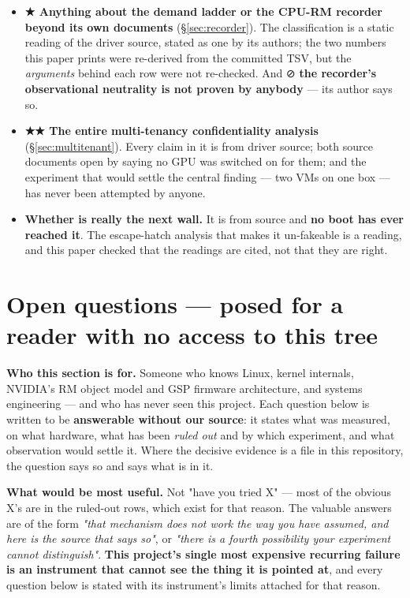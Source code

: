 \documentclass[10.5pt]{article}
\begin{document}
\begin{itemize}
  only the plan. Absence of evidence.
\item \textbf{★ Anything about the demand ladder or the CPU-RM recorder beyond its own documents}
  (\S\ref{sec:recorder}). The classification is a static reading of the driver source, stated as
  one by its authors; the two numbers this paper prints were re-derived from the committed TSV,
  but the \emph{arguments} behind each row were not re-checked. And ⊘ \textbf{the recorder's
  observational neutrality is not proven by anybody} — its author says so.
\item \textbf{★★ The entire multi-tenancy confidentiality analysis} (\S\ref{sec:multitenant}).
  Every claim in it is \inferred{} from driver source; both source documents open by saying no
  GPU was switched on for them; and the experiment that would settle the central finding — two
  VMs on one box — has never been attempted by anyone.
\item \textbf{Whether  is really the next wall.} It is \inferred{} from
  source and \textbf{no boot has ever reached it}. The escape-hatch analysis that makes it
  un-fakeable is a reading, and this paper checked that the readings are cited, not that they are
  right.
\end{itemize}

\section{Open questions --- posed for a reader with no access to this tree}
\label{sec:questions}

\begin{claimbox}\small
\textbf{Who this section is for.} Someone who knows Linux, kernel internals, NVIDIA's RM object
model and GSP firmware architecture, and systems engineering — and who has never seen this
project. Each question below is written to be \textbf{answerable without our source}: it states
what was measured, on what hardware, what has been \emph{ruled out} and by which experiment, and
what observation would settle it. Where the decisive evidence is a file in this repository, the
question says so and says what is in it.

\smallskip
\textbf{What would be most useful.} Not "have you tried X" — most of the obvious X's are in the
ruled-out rows, which exist for that reason. The valuable answers are of the form \emph{"that
mechanism does not work the way you have assumed, and here is the source that says so"}, or
\emph{"there is a fourth possibility your experiment cannot distinguish"}. \textbf{This project's
single most expensive recurring failure is an instrument that cannot see the thing it is pointed
at}, and every question below is stated with its instrument's limits attached for that reason.
\end{claimbox}
\end{document}
